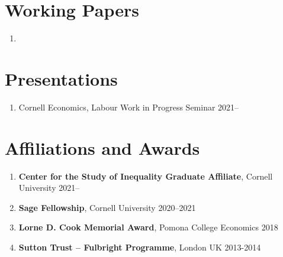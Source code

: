 \documentclass[letterpaper,11pt,oneside]{article}
\begin{document}
\section*{Working Papers}
\begin{enumerate}[itemsep=2.5pt, label={}]
    \item {}
\end{enumerate}


 
\section*{Presentations}
\begin{enumerate}[noitemsep, label={}]
    \item Cornell Economics, Labour Work in Progress Seminar 2021--
\end{enumerate}

\section*{Affiliations and Awards}
\begin{enumerate}[itemsep=2pt, label={}]
    \item \textbf{Center for the Study of Inequality Graduate Affiliate}, Cornell University 2021--
    \item \textbf{Sage Fellowship}, Cornell University 2020--2021
    \item \textbf{Lorne D. Cook Memorial Award}, Pomona College Economics 2018
    \item \textbf{Sutton Trust -- Fulbright Programme}, London UK 2013-2014  
\end{enumerate}
\end{document}
